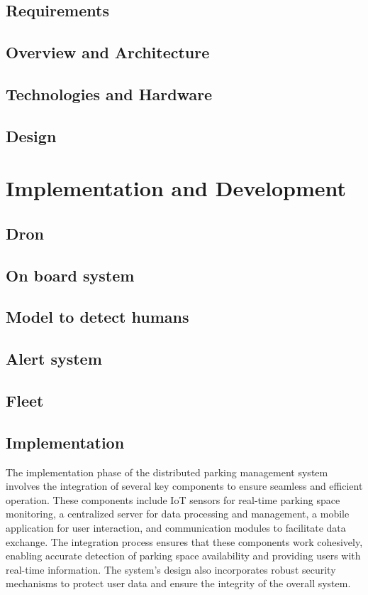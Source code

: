 \documentclass[oneside, 12pt, a4paper]{book}
\begin{document}
\chapter{Requirements}
\chapter{Overview and Architecture}
\chapter{Technologies and Hardware}
\chapter{Design}
\part{Implementation and Development}
\chapter{Dron}
\chapter{On board system}
\chapter{Model to detect humans}
\chapter{Alert system}
\chapter{Fleet}
\chapter{Implementation}
The implementation phase of the distributed parking management system involves the integration of several key components to ensure seamless and efficient operation. These components include IoT sensors for real-time parking space monitoring, a centralized server for data processing and management, a mobile application for user interaction, and communication modules to facilitate data exchange. The integration process ensures that these components work cohesively, enabling accurate detection of parking space availability and providing users with real-time information. The system's design also incorporates robust security mechanisms to protect user data and ensure the integrity of the overall system.
\end{document}
